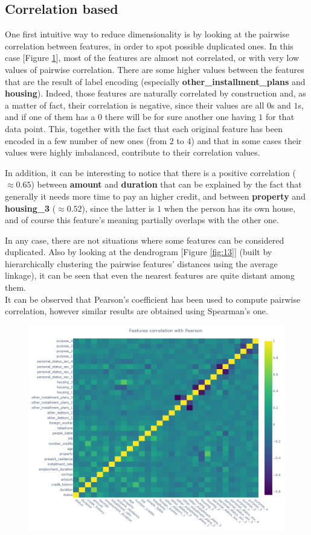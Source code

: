 \documentclass[letterpaper]{article}
\begin{document}
	\subsection{Correlation based}
	One first intuitive way to reduce dimensionality is by looking at the pairwise correlation between features, in order to spot possible duplicated ones. In this case [Figure \ref{fig:12}], most of the features are almost not correlated, or with very low values of pairwise correlation. There are some higher values between the features that are the result of label encoding (especially \textbf{other\_installment\_plans} and \textbf{housing}). Indeed, those features are naturally correlated by construction and, as a matter of fact, their correlation is negative, since their values are all $0$s and $1$s, and if one of them has a $0$ there will be for sure another one having $1$ for that data point. This, together with the fact that each original feature has been encoded in a few number of new ones (from $2$ to $4$) and that in some cases their values were highly imbalanced, contribute to their correlation values. 
	\par In addition, it can be interesting to notice that there is a positive correlation ($\approx 0.65$) between \textbf{amount} and \textbf{duration} that can be explained by the fact that generally it needs more time to pay an higher credit, and between \textbf{property} and \textbf{housing\_3} ($\approx 0.52$), since the latter is $1$ when the person has its own house, and of course this feature's meaning partially overlaps with the other one.
	\par In any case, there are not situations where some features can be considered duplicated. Also by looking at the dendrogram [Figure \ref{fig:13}] (built by hierarchically clustering the pairwise features' distances using the average linkage), it can be seen that even the nearest features are quite distant among them.  \\
	It can be observed that Pearson's coefficient has been used to compute pairwise correlation, however similar results are obtained using Spearman's one.
	\begin{figure}[h]
		\centering
		\includegraphics[width=.85\textwidth]{images/correlation_pearson.png}
		\label{fig:12}
	\end{figure}
\end{document}
